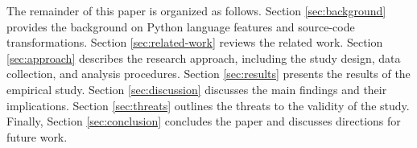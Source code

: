 The remainder of this paper is organized as follows. Section \ref{sec:background} provides the background on Python language features and source-code transformations. Section \ref{sec:related-work} reviews the related work. Section \ref{sec:approach} describes the research approach, including the study design, data collection, and analysis procedures. Section \ref{sec:results} presents the results of the empirical study. Section \ref{sec:discussion} discusses the main findings and their implications. Section \ref{sec:threats} outlines the threats to the validity of the study. Finally, Section \ref{sec:conclusion} concludes the paper and discusses directions for future work.




